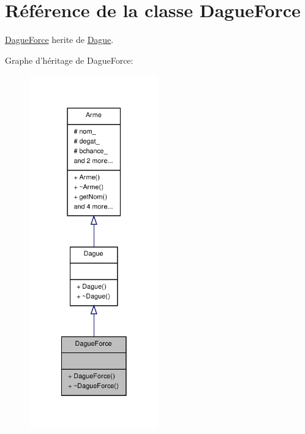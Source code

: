 \hypertarget{class_dague_force}{\section{Référence de la classe Dague\-Force}
\label{class_dague_force}
}


\hyperlink{class_dague_force}{Dague\-Force} herite de \hyperlink{class_dague}{Dague}.  




Graphe d'héritage de Dague\-Force\-:
\nopagebreak
\begin{figure}[H]
\begin{center}
\leavevmode
\includegraphics[width=158pt]{class_dague_force__inherit__graph}
\end{center}
\end{figure}


